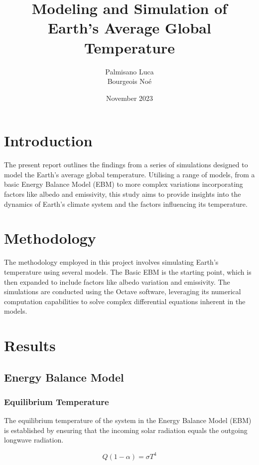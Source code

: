 \documentclass[12pt]{article}
\title{Modeling and Simulation of Earth's Average Global Temperature}
\author{Palmisano Luca \\ Bourgeois Noé}
\date{November 2023}
\begin{document}
\maketitle
\newpage

\section{Introduction}
The present report outlines the findings from a series of simulations designed to model the Earth's average global temperature. Utilising a range of models, from a basic Energy Balance Model (EBM) to more complex variations incorporating factors like albedo and emissivity, this study aims to provide insights into the dynamics of Earth's climate system and the factors influencing its temperature.

\section{Methodology}
The methodology employed in this project involves simulating Earth's temperature using several models. The Basic EBM is the starting point, which is then expanded to include factors like albedo variation and emissivity. The simulations are conducted using the Octave software, leveraging its numerical computation capabilities to solve complex differential equations inherent in the models.

\section{Results}

\subsection{Energy Balance Model}

\subsubsection{Equilibrium Temperature}
The equilibrium temperature of the system in the Energy Balance Model (EBM) is established by ensuring that the incoming solar radiation equals the outgoing longwave radiation\cite{kaper-2013-math-ac-equilibrium}.

\begin{equation} \label{eq:equilibrium-0}
Q(1 - \alpha) = \sigma T^4
\end{equation}
\end{document}
